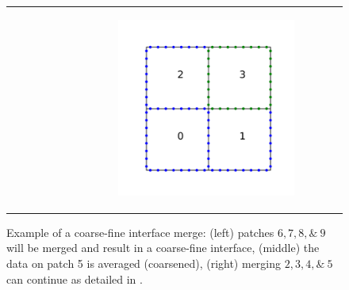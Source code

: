 \begin{figure}
\begin{tabular}{ccc}
\begin{subfigure}[t]{0.3\textwidth}
        \end{subfigure}
        &
        \begin{subfigure}[t]{0.3\textwidth}
            \centering
            \includegraphics[width=\textwidth, clip=true, trim={100 150 100 150}]{figures/adaptive_merge3.pdf}
        \end{subfigure}
    \end{tabular}
    \caption{Example of a coarse-fine interface merge: (left) patches $6, 7, 8, \&\ 9$ will be merged and result in a coarse-fine interface, (middle) the data on patch 5 is averaged (coarsened), (right) merging $2, 3, 4, \&\ 5$ can continue as detailed in .}
    \label{fig:adaptive_merge}
\end{figure}

